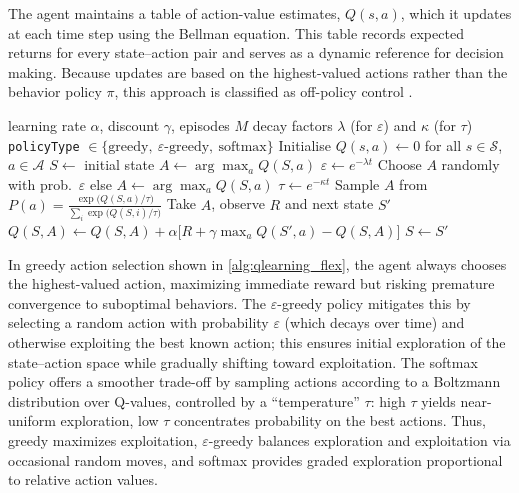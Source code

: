 The agent maintains a table of action-value estimates, $Q(s,a)$, which it updates at each time step using the Bellman equation. This table records expected returns for every state–action pair and serves as a dynamic reference for decision making. Because updates are based on the highest-valued actions rather than the behavior policy $\pi$, this approach is classified as off-policy control \cite{QLEARNMULTIAGENT2015}.

\begin{algorithm}
\caption{Q‑Learning with Flexible Action‑Selection}
\label{alg:qlearning_flex}
\begin{algorithmic}[1]
  \Require learning rate $\alpha$, discount $\gamma$, episodes $M$
  \Require decay factors $\lambda$ (for $\varepsilon$) and $\kappa$ (for $\tau$)
  \Require \texttt{policyType} $\in\{\text{greedy},\ \varepsilon\text{-greedy},\ \text{softmax}\}$
  \State Initialise $Q(s,a)\gets 0$ for all $s\in\mathcal{S}$, $a\in\mathcal{A}$
    \State $S\gets$ initial state
        \State $A\gets\arg\max_{a} Q(S,a)$
        \State $\varepsilon \gets e^{-\lambda t}$
        \State Choose $A$ randomly with prob.\ $\varepsilon$ else $A\gets\arg\max_{a} Q(S,a)$
      \Else {}
        \State $\tau \gets e^{-\kappa t}$
        \State Sample $A$ from $\displaystyle P(a)=\frac{\exp \bigl(Q(S,a)/\tau\bigr)}{\sum_{i}\exp \bigl(Q(S,i)/\tau\bigr)}$
      \EndIf
      \State Take $A$, observe $R$ and next state $S'$
      \State $Q(S,A)\gets Q(S,A)+\alpha\bigl[R+\gamma\max_{a}Q(S',a)-Q(S,A)\bigr]$
      \State $S\gets S'$
    \EndFor
  \EndFor
\end{algorithmic}
\end{algorithm}

In greedy action selection shown in \cref{alg:qlearning_flex}, the agent always chooses the highest-valued action, maximizing immediate reward but risking premature convergence to suboptimal behaviors. The $\varepsilon$-greedy policy mitigates this by selecting a random action with probability $\varepsilon$ (which decays over time) and otherwise exploiting the best known action; this ensures initial exploration of the state–action space while gradually shifting toward exploitation. The softmax policy offers a smoother trade-off by sampling actions according to a Boltzmann distribution over Q-values, controlled by a ``temperature'' $\tau$: high $\tau$ yields near-uniform exploration, low $\tau$ concentrates probability on the best actions. Thus, greedy maximizes exploitation, $\varepsilon$-greedy balances exploration and exploitation via occasional random moves, and softmax provides graded exploration proportional to relative action values.

